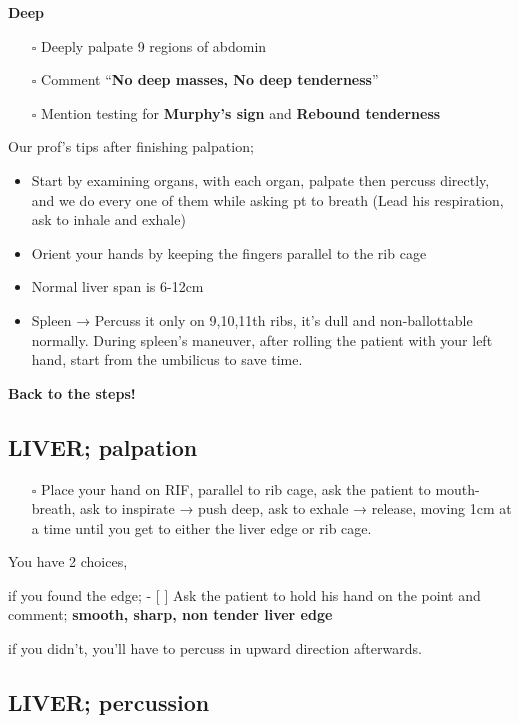 \documentclass[
  13.5pt,
  a4paper,
  DIV=11,
  numbers=noendperiod]{scrreprt}
\providecommand{\tightlist}{%
  \setlength{\itemsep}{0pt}\setlength{\parskip}{0pt}}
\begin{document}
\textbf{Deep}

\begin{itemize}
\tightlist
\item[$\square$]
  Deeply palpate 9 regions of abdomin
\item[$\square$]
  Comment ``\textbf{No deep masses, No deep tenderness}''
\item[$\square$]
  Mention testing for \textbf{Murphy's sign} and \textbf{Rebound
  tenderness}
\end{itemize}

Our prof's tips after finishing palpation;

\begin{itemize}
\item
  Start by examining organs, with each organ, palpate then percuss
  directly, and we do every one of them while asking pt to breath (Lead
  his respiration, ask to inhale and exhale)
\item
  Orient your hands by keeping the fingers parallel to the rib cage
\item
  Normal liver span is 6-12cm
\item
  Spleen → Percuss it only on 9,10,11th ribs, it's dull and
  non-ballottable normally. During spleen's maneuver, after rolling the
  patient with your left hand, start from the umbilicus to save time.
\end{itemize}

\textbf{Back to the steps!}

\subsection{LIVER; palpation}\label{liver-palpation}

\begin{itemize}
\tightlist
\item[$\square$]
  Place your hand on RIF, parallel to rib cage, ask the patient to
  mouth-breath, ask to inspirate → push deep, ask to exhale → release,
  moving 1cm at a time until you get to either the liver edge or rib
  cage.
\end{itemize}

You have 2 choices,

if you found the edge; - {[} {]} Ask the patient to hold his hand on the
point and comment; \textbf{smooth, sharp, non tender liver edge}

if you didn't, you'll have to percuss in upward direction afterwards.

\subsection{LIVER; percussion}\label{liver-percussion}
\end{document}
